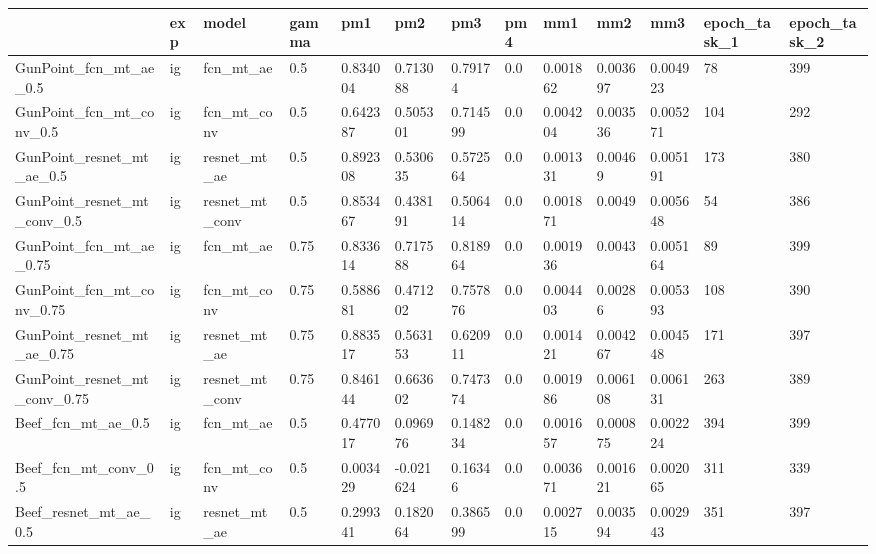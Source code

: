 \begin{tabular}{lllllllllllll}
\toprule
{} & exp &           model & gamma &       pm1 &       pm2 &       pm3 &  pm4 &       mm1 &       mm2 &       mm3 & epoch\_task\_1 & epoch\_task\_2 \\
\midrule
GunPoint\_fcn\_mt\_ae\_0.5       &  ig &       fcn\_mt\_ae &   0.5 &  0.834004 &  0.713088 &   0.79174 &  0.0 &  0.001862 &  0.003697 &  0.004923 &           78 &          399 \\
GunPoint\_fcn\_mt\_conv\_0.5     &  ig &     fcn\_mt\_conv &   0.5 &  0.642387 &  0.505301 &  0.714599 &  0.0 &  0.004204 &  0.003536 &  0.005271 &          104 &          292 \\
GunPoint\_resnet\_mt\_ae\_0.5    &  ig &    resnet\_mt\_ae &   0.5 &  0.892308 &  0.530635 &  0.572564 &  0.0 &  0.001331 &   0.00469 &  0.005191 &          173 &          380 \\
GunPoint\_resnet\_mt\_conv\_0.5  &  ig &  resnet\_mt\_conv &   0.5 &  0.853467 &  0.438191 &  0.506414 &  0.0 &  0.001871 &    0.0049 &  0.005648 &           54 &          386 \\
GunPoint\_fcn\_mt\_ae\_0.75      &  ig &       fcn\_mt\_ae &  0.75 &  0.833614 &  0.717588 &  0.818964 &  0.0 &  0.001936 &    0.0043 &  0.005164 &           89 &          399 \\
GunPoint\_fcn\_mt\_conv\_0.75    &  ig &     fcn\_mt\_conv &  0.75 &  0.588681 &  0.471202 &  0.757876 &  0.0 &  0.004403 &   0.00286 &  0.005393 &          108 &          390 \\
GunPoint\_resnet\_mt\_ae\_0.75   &  ig &    resnet\_mt\_ae &  0.75 &  0.883517 &  0.563153 &  0.620911 &  0.0 &  0.001421 &  0.004267 &  0.004548 &          171 &          397 \\
GunPoint\_resnet\_mt\_conv\_0.75 &  ig &  resnet\_mt\_conv &  0.75 &  0.846144 &  0.663602 &  0.747374 &  0.0 &  0.001986 &  0.006108 &  0.006131 &          263 &          389 \\
Beef\_fcn\_mt\_ae\_0.5           &  ig &       fcn\_mt\_ae &   0.5 &  0.477017 &  0.096976 &  0.148234 &  0.0 &  0.001657 &  0.000875 &  0.002224 &          394 &          399 \\
Beef\_fcn\_mt\_conv\_0.5         &  ig &     fcn\_mt\_conv &   0.5 &  0.003429 & -0.021624 &   0.16346 &  0.0 &  0.003671 &  0.001621 &  0.002065 &          311 &          339 \\
Beef\_resnet\_mt\_ae\_0.5        &  ig &    resnet\_mt\_ae &   0.5 &  0.299341 &  0.182064 &  0.386599 &  0.0 &  0.002715 &  0.003594 &  0.002943 &          351 &          397 \\

\end{tabular}
